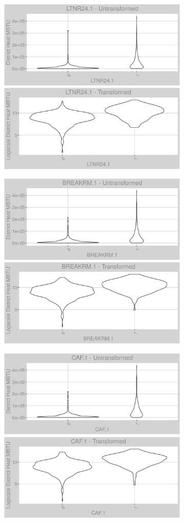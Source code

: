 \FloatBarrier
\newpage
\begin{figure}
\centering
\begin{subfigure}{1\textwidth}
\includegraphics[width=.49\textwidth, height=0.3\textheight]{Images/district_heat_var_original_12.png}
\includegraphics[width=.49\textwidth, height=0.3\textheight]{Images/district_heat_var_transformed_12.png}
\end{subfigure}
\begin{subfigure}{1\textwidth}
\centering
\includegraphics[width=.49\textwidth, height=0.3\textheight]{Images/district_heat_var_original_13.png}
\includegraphics[width=.49\textwidth, height=0.3\textheight]{Images/district_heat_var_transformed_13.png}
\end{subfigure}
\begin{subfigure}{1\textwidth}
\centering
\includegraphics[width=.49\textwidth, height=0.3\textheight]{Images/district_heat_var_original_14.png}
\includegraphics[width=.49\textwidth, height=0.3\textheight]{Images/district_heat_var_transformed_14.png}
\end{subfigure}
\end{figure}
